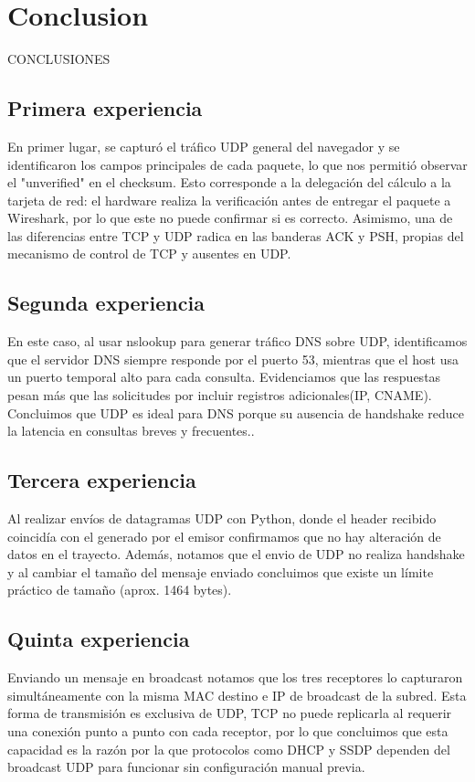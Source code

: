\section*{Conclusion}

CONCLUSIONES
\subsection{Primera experiencia}
En primer lugar, se capturó el tráfico UDP general del navegador y se identificaron los campos principales de cada paquete, lo que nos permitió observar el "unverified" en el checksum. Esto corresponde a la delegación del cálculo a la tarjeta de red: el hardware realiza la verificación antes de entregar el paquete a Wireshark, por lo que este no puede confirmar si es correcto. Asimismo, una de las diferencias entre TCP y UDP radica en las banderas ACK y PSH, propias del mecanismo de control de TCP y ausentes en UDP.
\subsection{Segunda experiencia}
En este caso, al usar nslookup para generar tráfico DNS sobre UDP, identificamos que el servidor DNS siempre responde por el puerto 53, mientras que el host usa un puerto temporal alto para cada consulta. Evidenciamos que las respuestas pesan más que las solicitudes por incluir registros adicionales(IP, CNAME). Concluimos que UDP es ideal para DNS porque su ausencia de handshake reduce la latencia en consultas breves y frecuentes..
\subsection{Tercera experiencia}
Al realizar envíos de datagramas UDP con Python, donde el header recibido coincidía  con el generado por el emisor confirmamos que no hay alteración de datos en el trayecto. Además, notamos que el envio de UDP no realiza handshake y al cambiar el tamaño del mensaje enviado concluimos que existe un límite práctico de tamaño (aprox. 1464 bytes).   

\subsection{Quinta experiencia}
Enviando un mensaje en broadcast notamos que los tres receptores lo capturaron simultáneamente con la misma MAC destino e IP de broadcast de la subred. Esta forma de transmisión es exclusiva de UDP, TCP no puede replicarla al requerir una conexión punto a punto con cada receptor, por lo que concluimos que esta capacidad es la razón por la que protocolos como DHCP y SSDP dependen del broadcast UDP para funcionar sin configuración manual previa.


